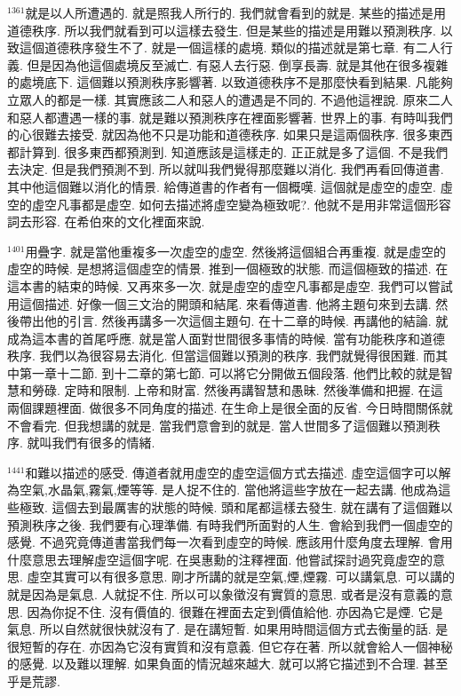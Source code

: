 \documentclass{book}
\begin{document}
$^{1361}$就是以人所遭遇的.
就是照我人所行的.
我們就會看到的就是.
某些的描述是用道德秩序.
所以我們就看到可以這樣去發生.
但是某些的描述是用難以預測秩序.
以致這個道德秩序發生不了.
就是一個這樣的處境.
類似的描述就是第七章.
有二人行義.
但是因為他這個處境反至滅亡.
有惡人去行惡.
倒享長壽.
就是其他在很多複雜的處境底下.
這個難以預測秩序影響著.
以致道德秩序不是那麼快看到結果.
凡能夠立眾人的都是一樣.
其實應該二人和惡人的遭遇是不同的.
不過他這裡說.
原來二人和惡人都遭遇一樣的事.
就是難以預測秩序在裡面影響著.
世界上的事.
有時叫我們的心很難去接受.
就因為他不只是功能和道德秩序.
如果只是這兩個秩序.
很多東西都計算到.
很多東西都預測到.
知道應該是這樣走的.
正正就是多了這個.
不是我們去決定.
但是我們預測不到.
所以就叫我們覺得那麼難以消化.
我們再看回傳道書.
其中他這個難以消化的情景.
給傳道書的作者有一個概嘆.
這個就是虛空的虛空.
虛空的虛空凡事都是虛空.
如何去描述將虛空變為極致呢?.
他就不是用非常這個形容詞去形容.
在希伯來的文化裡面來說.

$^{1401}$用疊字.
就是當他重複多一次虛空的虛空.
然後將這個組合再重複.
就是虛空的虛空的時候.
是想將這個虛空的情景.
推到一個極致的狀態.
而這個極致的描述.
在這本書的結束的時候.
又再來多一次.
就是虛空的虛空凡事都是虛空.
我們可以嘗試用這個描述.
好像一個三文治的開頭和結尾.
來看傳道書.
他將主題句來到去講.
然後帶出他的引言.
然後再講多一次這個主題句.
在十二章的時候.
再講他的結論.
就成為這本書的首尾呼應.
就是當人面對世間很多事情的時候.
當有功能秩序和道德秩序.
我們以為很容易去消化.
但當這個難以預測的秩序.
我們就覺得很困難.
而其中第一章十二節.
到十二章的第七節.
可以將它分開做五個段落.
他們比較的就是智慧和勞碌.
定時和限制.
上帝和財富.
然後再講智慧和愚昧.
然後準備和把握.
在這兩個課題裡面.
做很多不同角度的描述.
在生命上是很全面的反省.
今日時間關係就不會看完.
但我想講的就是.
當我們意會到的就是.
當人世間多了這個難以預測秩序.
就叫我們有很多的情緒.

$^{1441}$和難以描述的感受.
傳道者就用虛空的虛空這個方式去描述.
虛空這個字可以解為空氣,水晶氣,霧氣,煙等等.
是人捉不住的.
當他將這些字放在一起去講.
他成為這些極致.
這個去到最厲害的狀態的時候.
頭和尾都這樣去發生.
就在講有了這個難以預測秩序之後.
我們要有心理準備.
有時我們所面對的人生.
會給到我們一個虛空的感覺.
不過究竟傳道書當我們每一次看到虛空的時候.
應該用什麼角度去理解.
會用什麼意思去理解虛空這個字呢.
在吳惠勳的注釋裡面.
他嘗試探討過究竟虛空的意思.
虛空其實可以有很多意思.
剛才所講的就是空氣,煙,煙霧.
可以講氣息.
可以講的就是因為是氣息.
人就捉不住.
所以可以象徵沒有實質的意思.
或者是沒有意義的意思.
因為你捉不住.
沒有價值的.
很難在裡面去定到價值給他.
亦因為它是煙.
它是氣息.
所以自然就很快就沒有了.
是在講短暫.
如果用時間這個方式去衡量的話.
是很短暫的存在.
亦因為它沒有實質和沒有意義.
但它存在著.
所以就會給人一個神秘的感覺.
以及難以理解.
如果負面的情況越來越大.
就可以將它描述到不合理.
甚至乎是荒謬.
\end{document}
